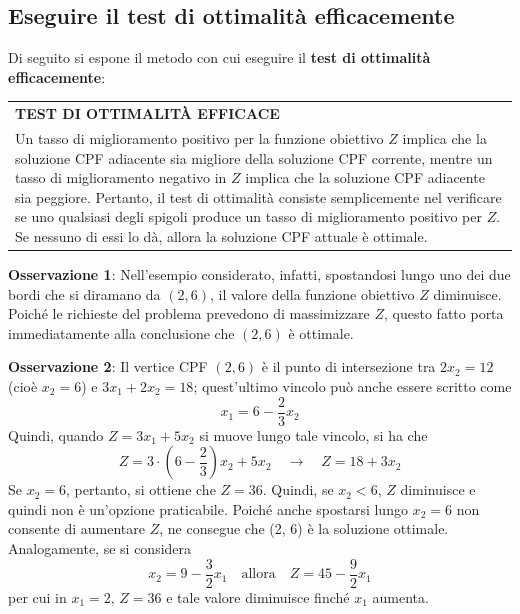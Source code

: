 \documentclass[a4paper]{extarticle}
\renewcommand\arraystretch{}
\begin{document}
\subsection{Eseguire il test di ottimalità efficacemente}
Di seguito si espone il metodo con cui eseguire il \textbf{test di ottimalità efficacemente}:

\vspace{1em}
\setlength{\tabcolsep}{14pt}
\renewcommand{\arraystretch}{2}
\noindent
\begin{tabularx}{\textwidth}{@{}|P|@{}}
    \hline
    {\textbf{TEST DI OTTIMALITÀ EFFICACE}}\\
    \parbox{\linewidth}{Un tasso di miglioramento positivo per la funzione obiettivo $Z$ implica che la soluzione CPF adiacente sia migliore della soluzione CPF corrente, mentre un tasso di miglioramento negativo in $Z$ implica che la soluzione CPF adiacente sia peggiore.\\
    Pertanto, il test di ottimalità consiste semplicemente nel verificare se uno qualsiasi degli spigoli produce un tasso di miglioramento positivo per $Z$. Se nessuno di essi lo dà, allora la soluzione CPF attuale è ottimale.\vspace{3mm}}\\
    \hline
\end{tabularx}

\vspace{1em}
\noindent
\textbf{Osservazione 1}: Nell'esempio considerato, infatti, spostandosi lungo uno dei due bordi che si diramano da $(2,6)$, il valore della funzione obiettivo $Z$ diminuisce. Poiché le richieste del problema prevedono di massimizzare $Z$, questo fatto porta immediatamente alla conclusione che $(2,6)$ è ottimale.

\vspace{1em}
\noindent
\textbf{Osservazione 2}: Il vertice CPF $(2,6)$ è il punto di intersezione tra $2x_2 = 12$ (cioè $x_2 = 6$) e $3x_1 + 2x_2 = 18$; quest'ultimo vincolo può anche essere scritto come
\[x_1 = 6 - \frac{2}{3}x_2\]
Quindi, quando $Z = 3x_1 + 5x_2$ si muove lungo tale vincolo, si ha che 
\[Z = 3 \cdot \left(6-\frac{2}{3}\right)x_2+5x_2 \hspace{1em} \rightarrow \hspace{1em} Z = 18+3x_2\]
Se $x_2 = 6$, pertanto, si ottiene che $Z = 36$. Quindi, se $x_2 < 6$, $Z$ diminuisce e quindi non è un'opzione praticabile. Poiché anche spostarsi lungo $x_2 = 6$ non consente di aumentare $Z$, ne consegue che (2, 6) è la soluzione ottimale.\\
Analogamente, se si considera
\[x_2 = 9 - \frac{3}{2}x_1 \hspace{1em} \text{allora} \hspace{1em} Z = 45 - \frac{9}{2} x_1\]
per cui in $x_1 = 2$, $Z = 36$ e tale valore diminuisce finché $x_1$ aumenta.
\end{document}
